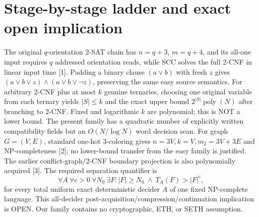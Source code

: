 \documentclass[11pt]{article}
\begin{document}
\section{Stage-by-stage ladder and exact open implication}
The original $q$-orientation 2-SAT chain has $n=q+3$, $m=q+4$, and its all-one input requires $q$ addressed orientation reads, while SCC solves the full 2-CNF in linear input time [1]. Padding a binary clause $(a\lor b)$ with fresh $z$ gives $(a\lor b\lor z)\land(a\lor b\lor\neg z)$, preserving the same easy source semantics. For arbitrary 2-CNF plus at most $k$ genuine ternaries, choosing one original variable from each ternary yields $|S|\le k$ and the exact upper bound $2^{|S|}\operatorname{poly}(N)$ after branching to 2-CNF. Fixed and logarithmic $k$ are polynomial; this is NOT a lower bound. The present family has a quadratic number of explicitly written compatibility fields but an $O(N/\log N)$ word decision scan. For graph $G=(V,E)$, standard one-hot 3-coloring gives $n=3V,k=V,m_2=3V+3E$ and NP-completeness [2]; no lower-bound transfer from the easy family is justified. The earlier conflict-graph/2-CNF boundary projection is also polynomially acquired [3].
The required separation quantifier is
\[
\forall A\ \forall c>0\ \forall N_0\ \exists F:
|F|\ge N_0\ \land\ T_A(F)>|F|^c,
\]
for every total uniform exact deterministic decider $A$ of one fixed NP-complete language. This all-decider post-acquisition/compression/continuation implication is OPEN. Our family contains no cryptographic, ETH, or SETH assumption.
\end{document}

